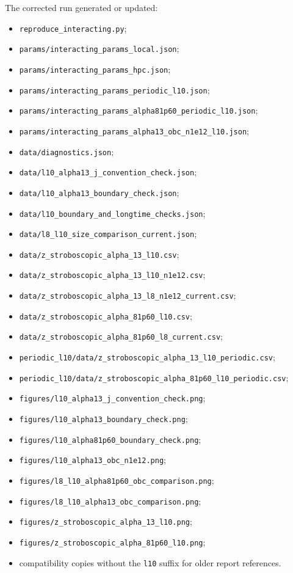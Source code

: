 \documentclass[11pt,a4paper]{article}
\begin{document}
The corrected run generated or updated:
\begin{itemize}
  \item \texttt{reproduce\_interacting.py};
  \item \texttt{params/interacting\_params\_local.json};
  \item \texttt{params/interacting\_params\_hpc.json};
  \item \texttt{params/interacting\_params\_periodic\_l10.json};
  \item \texttt{params/interacting\_params\_alpha81p60\_periodic\_l10.json};
  \item \texttt{params/interacting\_params\_alpha13\_obc\_n1e12\_l10.json};
  \item \texttt{data/diagnostics.json};
  \item \texttt{data/l10\_alpha13\_j\_convention\_check.json};
  \item \texttt{data/l10\_alpha13\_boundary\_check.json};
  \item \texttt{data/l10\_boundary\_and\_longtime\_checks.json};
  \item \texttt{data/l8\_l10\_size\_comparison\_current.json};
  \item \texttt{data/z\_stroboscopic\_alpha\_13\_l10.csv};
  \item \texttt{data/z\_stroboscopic\_alpha\_13\_l10\_n1e12.csv};
  \item \texttt{data/z\_stroboscopic\_alpha\_13\_l8\_n1e12\_current.csv};
  \item \texttt{data/z\_stroboscopic\_alpha\_81p60\_l10.csv};
  \item \texttt{data/z\_stroboscopic\_alpha\_81p60\_l8\_current.csv};
  \item \texttt{periodic\_l10/data/z\_stroboscopic\_alpha\_13\_l10\_periodic.csv};
  \item \texttt{periodic\_l10/data/z\_stroboscopic\_alpha\_81p60\_l10\_periodic.csv};
  \item \texttt{figures/l10\_alpha13\_j\_convention\_check.png};
  \item \texttt{figures/l10\_alpha13\_boundary\_check.png};
  \item \texttt{figures/l10\_alpha81p60\_boundary\_check.png};
  \item \texttt{figures/l10\_alpha13\_obc\_n1e12.png};
  \item \texttt{figures/l8\_l10\_alpha81p60\_obc\_comparison.png};
  \item \texttt{figures/l8\_l10\_alpha13\_obc\_comparison.png};
  \item \texttt{figures/z\_stroboscopic\_alpha\_13\_l10.png};
  \item \texttt{figures/z\_stroboscopic\_alpha\_81p60\_l10.png};
  \item compatibility copies without the \texttt{l10} suffix for older report references.
\end{itemize}
\end{document}
